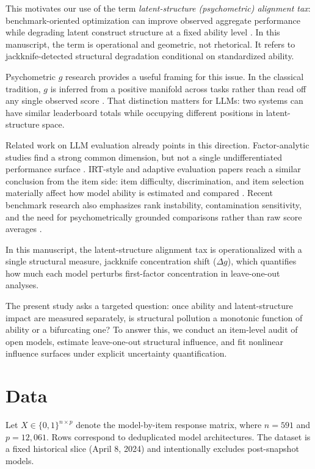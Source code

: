 \documentclass[11pt]{article}
\begin{document}
This motivates our use of the term \emph{latent-structure (psychometric) alignment tax}: benchmark-oriented optimization can improve observed aggregate performance while degrading latent construct structure at a fixed ability level \citep{federiakin2025leaderboards, zhou2026lost, li2026adaptive}. In this manuscript, the term is operational and geometric, not rhetorical. It refers to jackknife-detected structural degradation conditional on standardized ability.

Psychometric $g$ research provides a useful framing for this issue. In the classical tradition, $g$ is inferred from a positive manifold across tasks rather than read off any single observed score \citep{spearman1904general, carroll1993human, jensen1998g}. That distinction matters for LLMs: two systems can have similar leaderboard totals while occupying different positions in latent-structure space.

Related work on LLM evaluation already points in this direction. Factor-analytic studies find a strong common dimension, but not a single undifferentiated performance surface \citep{burnell2023structure, ilic2024interrelated}. IRT-style and adaptive evaluation papers reach a similar conclusion from the item side: item difficulty, discrimination, and item selection materially affect how model ability is estimated and compared \citep{zhou2026lost, tambon2025taskeval, taschetto2025enem, truong2025amortized, li2026adaptive, liao2025legoirt}. Recent benchmark research also emphasizes rank instability, contamination sensitivity, and the need for psychometrically grounded comparisons rather than raw score averages \citep{federiakin2025leaderboards, wu2025antileakbench, chen2025emnlpcontam, chen2025recentcontam}.

In this manuscript, the latent-structure alignment tax is operationalized with a single structural measure, jackknife concentration shift ($\Delta g$), which quantifies how much each model perturbs first-factor concentration in leave-one-out analyses.

The present study asks a targeted question: once ability and latent-structure impact are measured separately, is structural pollution a monotonic function of ability or a bifurcating one? To answer this, we conduct an item-level audit of open models, estimate leave-one-out structural influence, and fit nonlinear influence surfaces under explicit uncertainty quantification.

\section{Data}
Let $X \in \{0,1\}^{n \times p}$ denote the model-by-item response matrix, where $n=591$ and $p=12{,}061$. Rows correspond to deduplicated model architectures. The dataset is a fixed historical slice (April 8, 2024) and intentionally excludes post-snapshot models.
\end{document}
